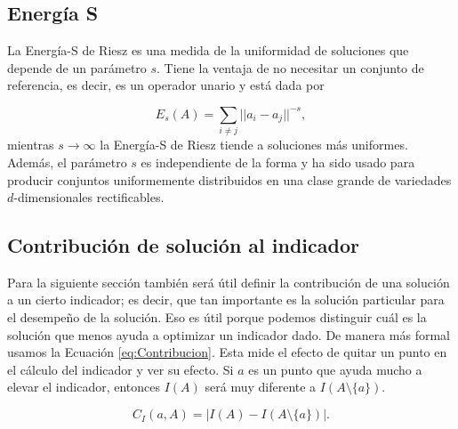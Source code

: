 
\subsection{Energía S} \label{sec:Energía-S}
La Energía-S de Riesz \cite{sEnergy} es una medida de la uniformidad de soluciones que depende de un parámetro $s$. Tiene la ventaja de no necesitar un conjunto de referencia, es decir, es un operador unario y está dada por 

\begin{equation} \label{eq:S_energy}
    E_s(A)=\sum_{i\neq j} ||a_i-a_j||^{-s},
\end{equation}
mientras $s\rightarrow \infty$ la Energía-S de Riesz tiende a soluciones más uniformes. Además, el parámetro $s$ es independiente de la forma y ha sido usado para producir conjuntos uniformemente distribuidos en una clase grande de variedades $d$-dimensionales rectificables.

\subsection*{Contribución de solución al indicador}
Para la siguiente sección también será útil definir la contribución de una solución a un cierto indicador; es decir, que tan importante es la solución particular para el desempeño de la solución. Eso es útil porque podemos distinguir cuál es la solución que menos ayuda a optimizar un indicador dado. De manera más formal usamos la Ecuación \eqref{eq:Contribucion}. Esta mide el efecto de quitar un punto en el cálculo del indicador y ver su efecto. Si $a$ es un punto que ayuda mucho a elevar el indicador, entonces $I(A)$ será muy diferente a $I(A \setminus \{a\})$.

\begin{equation} \label{eq:Contribucion}
    C_I(a,A)=|I(A)-I(A \setminus \{a\}) |.
\end{equation}


